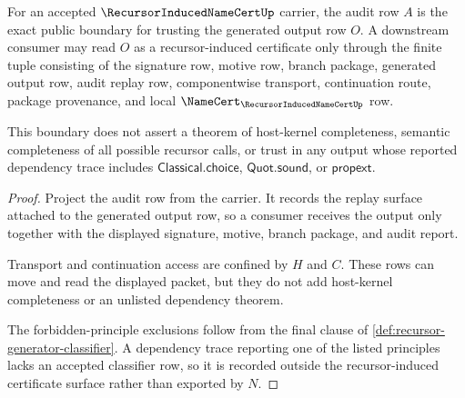 \begin{theorem}
\label{thm:recursor-generator-audit-boundary}
For an accepted $\RecursorInducedNameCertUp$ carrier, the audit row $A$ is the exact public boundary for trusting the generated output row $O$. A downstream consumer may read $O$ as a recursor-induced certificate only through the finite tuple consisting of the signature row, motive row, branch package, generated output row, audit replay row, componentwise transport, continuation route, package provenance, and local $\NameCert_{\RecursorInducedNameCertUp}$ row.

This boundary does not assert a theorem of host-kernel completeness, semantic completeness of all possible recursor calls, or trust in any output whose reported dependency trace includes $\mathsf{Classical.choice}$, $\mathsf{Quot.sound}$, or $\mathsf{propext}$.
\end{theorem}
\begin{proof}
Project the audit row from the carrier. It records the replay surface attached to the generated output row, so a consumer receives the output only together with the displayed signature, motive, branch package, and audit report.

Transport and continuation access are confined by $H$ and $C$. These rows can move and read the displayed packet, but they do not add host-kernel completeness or an unlisted dependency theorem.

The forbidden-principle exclusions follow from the final clause of \autoref{def:recursor-generator-classifier}. A dependency trace reporting one of the listed principles lacks an accepted classifier row, so it is recorded outside the recursor-induced certificate surface rather than exported by $N$.
\end{proof}

